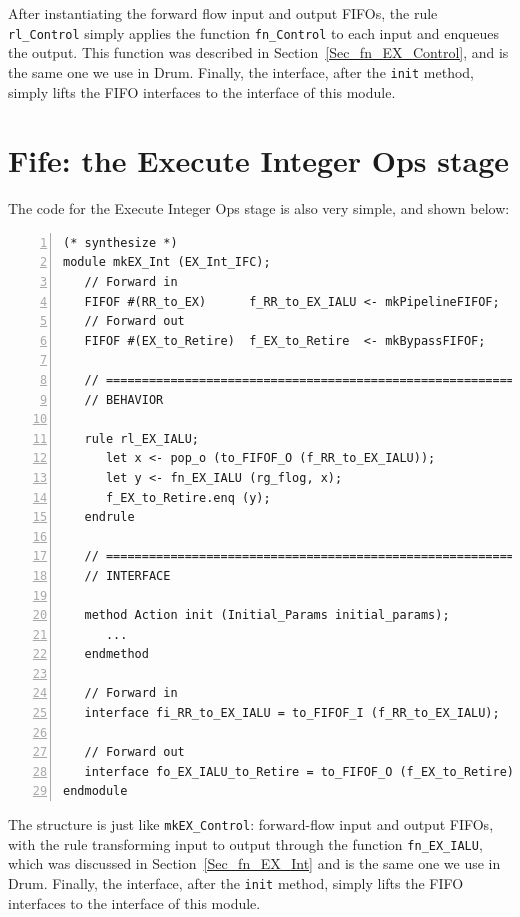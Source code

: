 After instantiating the forward flow input and output FIFOs, the rule
\verb|rl_Control| simply applies the function \verb|fn_Control| to
each input and enqueues the output.  This function was described in
Section~\ref{Sec_fn_EX_Control}, and is the same one we use in
Drum.  Finally, the interface, after the \verb|init| method, simply
lifts the FIFO interfaces to the interface of this module.


\section{Fife: the Execute Integer Ops stage}

\label{Sec_Fife_IALU_stage}

The code for the Execute Integer Ops stage is also very simple, and
shown below:

{\small
\begin{Verbatim}[frame=single, numbers=left, label=(In file:src\_Fife/S4\_EX\_Int.bsv)]
(* synthesize *)
module mkEX_Int (EX_Int_IFC);
   // Forward in
   FIFOF #(RR_to_EX)      f_RR_to_EX_IALU <- mkPipelineFIFOF;
   // Forward out
   FIFOF #(EX_to_Retire)  f_EX_to_Retire  <- mkBypassFIFOF;

   // ================================================================
   // BEHAVIOR

   rule rl_EX_IALU;
      let x <- pop_o (to_FIFOF_O (f_RR_to_EX_IALU));
      let y <- fn_EX_IALU (rg_flog, x);
      f_EX_to_Retire.enq (y);
   endrule

   // ================================================================
   // INTERFACE

   method Action init (Initial_Params initial_params);
      ...
   endmethod

   // Forward in
   interface fi_RR_to_EX_IALU = to_FIFOF_I (f_RR_to_EX_IALU);

   // Forward out
   interface fo_EX_IALU_to_Retire = to_FIFOF_O (f_EX_to_Retire);
endmodule
\end{Verbatim}
}

The structure is just like \verb|mkEX_Control|: forward-flow input and
output FIFOs, with the rule transforming input to output through the
function \verb|fn_EX_IALU|, which was discussed in
Section~\ref{Sec_fn_EX_Int} and is the same one we use in Drum.
Finally, the interface, after the \verb|init| method, simply lifts the
FIFO interfaces to the interface of this module.

